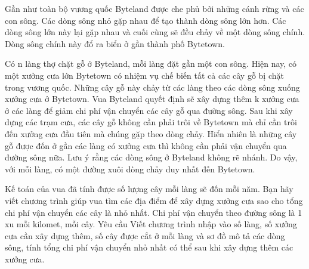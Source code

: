 Gần như toàn bộ vương quốc Byteland được che phủ bởi những cánh rừng và các con sông. Các dòng sông nhỏ gặp nhau để tạo thành dòng sông lớn hơn. Các dòng sông lớn này lại gặp nhau và cuối cùng sẽ đều chảy về một dòng sông chính. Dòng sông chính này đổ ra biển ở gần thành phố Bytetown.  

   Có n làng thợ chặt gỗ ở Byteland, mỗi làng đặt gần một con sông. Hiện nay, có một xưởng cưa lớn Bytetown có nhiệm vụ chế biến tất cả các cây gỗ bị chặt trong vương quốc. Những cây gỗ này chảy từ các làng theo các dòng sông xuống xưởng cưa ở Bytetown. Vua Byteland quyết định sẽ xây dựng thêm k xưởng cưa ở các làng để giảm chi phí vận chuyển các cây gỗ qua đường sông. Sau khi xây dựng các trạm cưa, các cây gỗ không cần phải trôi về Bytetown mà chỉ cần trôi đến xưởng cưa đầu tiên mà chúng gặp theo dòng chảy. Hiển nhiên là những cây gỗ được đốn ở gần các làng có xưởng cưa thì không cần phải vận chuyển qua đường sông nữa. Lưu ý rằng các dòng sông ở Byteland không rẽ nhánh. Do vậy, với mỗi làng, có một đường xuôi dòng chảy duy nhất đến Bytetown.  

   Kế toán của vua đã tính được số lượng cây mỗi làng sẽ đốn mỗi năm. Bạn hãy viết chương trình giúp vua tìm các địa điểm để xây dựng xưởng cưa sao cho tổng chi phí vận chuyển các cây là nhỏ nhất. Chi phí vận chuyển theo đường sông là 1 xu mỗi kilomet, mỗi cây.
   Yêu cầu  
Viết chương trình nhập vào số làng, số xưởng cưa cần xây dựng thêm, số cây được cắt ở mỗi làng và sơ đồ mô tả các dòng sông, tính tổng chi phí vận chuyển nhỏ nhất có thể sau khi xây dựng thêm các xưởng cưa.